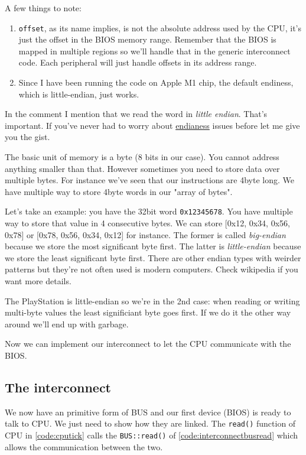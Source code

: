 \documentclass[a4paper]{article}
\newcommand{\code}[1] {\texttt{#1}}
\begin{document}
A few things to note:
\begin{enumerate}
\item \code{offset}, as its name implies, is not the
absolute address used by the CPU, it's just the offset in the BIOS
memory range. Remember that the BIOS is mapped in multiple regions so
we'll handle that in the generic interconnect code. Each peripheral
will just handle offsets in its address range.
\item Since I have been running the code on Apple M1 chip, the default
endiness, which is little-endian, just works.  
\end{enumerate}

In the comment I mention that we read the word in \emph{little
  endian}. That's important. If you've never had to worry about
\href{https://en.wikipedia.org/wiki/Endianness}{endianess} issues
before let me give you the gist.

The basic unit of memory is a byte (8 bits in our case). You cannot
address anything smaller than that. However sometimes you need to
store data over multiple bytes. For instance we've seen that our
instructions are 4byte long. We have multiple way to store 4byte words
in our "array of bytes".

Let's take an example: you have the 32bit word
\code{0x12345678}. You have multiple way to store that value in 4
consecutive bytes. We can store [0x12, 0x34, 0x56, 0x78] or
[0x78, 0x56, 0x34, 0x12] for instance. The former is called
\emph{big-endian} because we store the most significant byte
first. The latter is \emph{little-endian} because we store the least
significant byte first. There are other endian types with weirder
patterns but they're not often used is modern computers. Check
wikipedia if you want more details.

The PlayStation is little-endian so we're in the 2nd case: when
reading or writing multi-byte values the least significiant byte goes
first. If we do it the other way around we'll end up with garbage.

Now we can implement our interconnect to let the CPU communicate with
the BIOS.

\subsection{The interconnect}

We now have an primitive form of BUS and our first device (BIOS) is ready
to talk to CPU. We just need to show how they are linked.  The \code{read()}
function of CPU in \ref{code:cputick} calls the \code{BUS::read()} of
\ref{code:interconnectbusread} which allows the communication between
the two.
\end{document}
